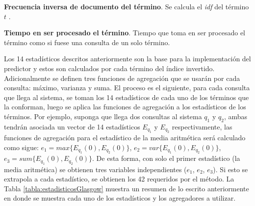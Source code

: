 \begin{list}{}{}
	\item \textbf{Frecuencia inversa de documento del término}. Se calcula el \textit{idf} del término $t$ \citep{Baeza-Yates:2011}.
	
	\item \textbf{Tiempo en ser procesado el término}. Tiempo que toma en ser procesado el término como si fuese una consulta de un solo término.

\end{list}

Los 14 estadísticos descritos anteriormente son la base para la implementación del predictor y estos son calculados por cada término del índice invertido. Adicionalmente se definen tres funciones de agregación que se usarán por cada consulta: máximo, varianza y suma. El proceso es el siguiente, para cada consulta que llega al sistema, se toman los 14 estadísticos de cada uno de los términos que la conforman, luego se aplica las funciones de agregación a los estadísticos de los términos. Por ejemplo, suponga que llega dos consultas al sistema $q_1$ y $q_2$, ambas tendrán asociada un vector de 14 estadísticos $E_{q_1}$ y $E_{q_2}$ respectivamente, las funciones de agregación para el estadístico de la media aritmética será calculado como sigue: $e_1 = max\{E_{q_1}(0), E_{q_2}(0)\}$, $e_2 = var\{E_{q_1}(0), E_{q_2}(0)\}$, $e_3 = sum\{E_{q_1}(0), E_{q_2}(0)\}$. De esta forma, con solo el primer estadístico (la media aritmética) se obtienen tres variables independientes ($e_1$, $e_2$, $e_3$). Si esto se extrapola a cada estadístico, se obtienen los 42 requeridos por el método. 
La Tabla \ref{tabla:estadisticosGlasgow} muestra un resumen de lo escrito anteriormente en donde se muestra cada uno de los estadísticos y los agregadores a utilizar. 

